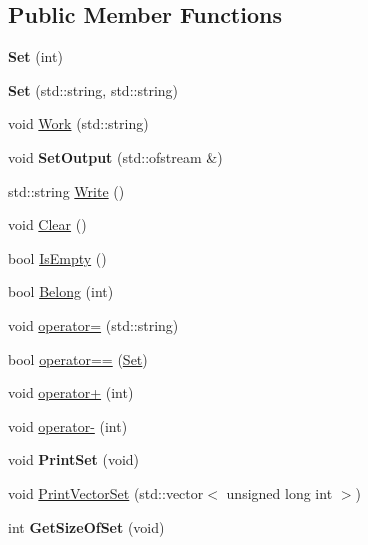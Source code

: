 \subsection*{Public Member Functions}
\begin{DoxyCompactItemize}
\item 
\mbox{\label{classSet_a545e44270dff7f873f7203aa5c6ca3a1}} 
{\bfseries Set} (int)
\item 
\mbox{\label{classSet_a9387dcd9189f0b036d731cf4f169de05}} 
{\bfseries Set} (std\+::string, std\+::string)
\item 
void \hyperlink{classSet_aa25ad5b9d72e4d428eb564b2eb208e3b}{Work} (std\+::string)
\item 
\mbox{\label{classSet_acc57a5a86498c7efb365b4dfbf1fd247}} 
void {\bfseries Set\+Output} (std\+::ofstream \&)
\item 
std\+::string \hyperlink{classSet_afc0f35a8d6903b892bb283813511fea9}{Write} ()
\item 
void \hyperlink{classSet_abe5c5439f3665baba2da0b1f1a4c03fd}{Clear} ()
\item 
bool \hyperlink{classSet_a0361a3a2b7a408514a259b326245cbc7}{Is\+Empty} ()
\item 
bool \hyperlink{classSet_a8fb9899afe9a09628706cf539cc75a1c}{Belong} (int)
\item 
void \hyperlink{classSet_a7f28cadb13f4cc86a87f64b9f885877a}{operator=} (std\+::string)
\item 
bool \hyperlink{classSet_a3087ba7a27e33fbb1b2a091c405ba046}{operator==} (\hyperlink{classSet}{Set})
\item 
void \hyperlink{classSet_a33786bba5f634c5023d047b5f1f1a292}{operator+} (int)
\item 
void \hyperlink{classSet_a1e58afdc9befac1dbe295a0bdccfeacb}{operator-\/} (int)
\item 
\mbox{\label{classSet_a1440c7bdad66b1864b41b4aafb188245}} 
void {\bfseries Print\+Set} (void)
\item 
void \hyperlink{classSet_a167b6d87b1698a61f269835c34c455cc}{Print\+Vector\+Set} (std\+::vector$<$ unsigned long int $>$)
\item 
\mbox{\label{classSet_a6c55977d6e5c48ab791bbe49e832c5ba}} 
int {\bfseries Get\+Size\+Of\+Set} (void)
\end{DoxyCompactItemize}
